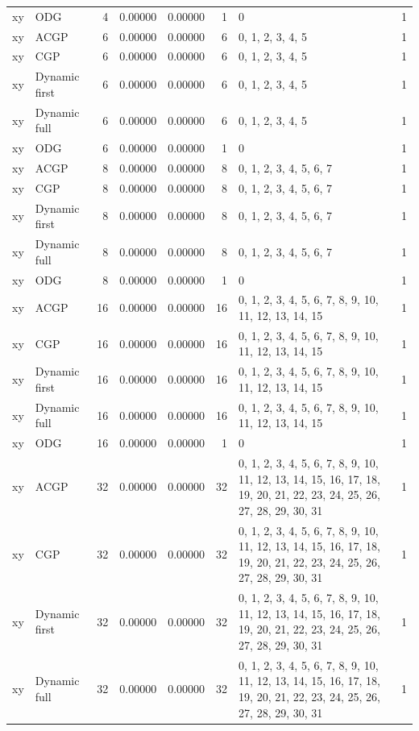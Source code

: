 \documentclass[10pt,a4paper]{article}
\begin{document}
\begin{longtable}{@{}p{23mm}p{29mm}rrrrp{36mm}r@{}}
xy & ODG & 4 & 0.00000 & 0.00000 & 1 & 0 & 1 \\
xy & ACGP & 6 & 0.00000 & 0.00000 & 6 & 0, 1, 2, 3, 4, 5 & 1 \\
xy & CGP & 6 & 0.00000 & 0.00000 & 6 & 0, 1, 2, 3, 4, 5 & 1 \\
xy & Dynamic first & 6 & 0.00000 & 0.00000 & 6 & 0, 1, 2, 3, 4, 5 & 1 \\
xy & Dynamic full & 6 & 0.00000 & 0.00000 & 6 & 0, 1, 2, 3, 4, 5 & 1 \\
xy & ODG & 6 & 0.00000 & 0.00000 & 1 & 0 & 1 \\
xy & ACGP & 8 & 0.00000 & 0.00000 & 8 & 0, 1, 2, 3, 4, 5, 6, 7 & 1 \\
xy & CGP & 8 & 0.00000 & 0.00000 & 8 & 0, 1, 2, 3, 4, 5, 6, 7 & 1 \\
xy & Dynamic first & 8 & 0.00000 & 0.00000 & 8 & 0, 1, 2, 3, 4, 5, 6, 7 & 1 \\
xy & Dynamic full & 8 & 0.00000 & 0.00000 & 8 & 0, 1, 2, 3, 4, 5, 6, 7 & 1 \\
xy & ODG & 8 & 0.00000 & 0.00000 & 1 & 0 & 1 \\
xy & ACGP & 16 & 0.00000 & 0.00000 & 16 & 0, 1, 2, 3, 4, 5, 6, 7, 8, 9, 10, 11, 12, 13, 14, 15 & 1 \\
xy & CGP & 16 & 0.00000 & 0.00000 & 16 & 0, 1, 2, 3, 4, 5, 6, 7, 8, 9, 10, 11, 12, 13, 14, 15 & 1 \\
xy & Dynamic first & 16 & 0.00000 & 0.00000 & 16 & 0, 1, 2, 3, 4, 5, 6, 7, 8, 9, 10, 11, 12, 13, 14, 15 & 1 \\
xy & Dynamic full & 16 & 0.00000 & 0.00000 & 16 & 0, 1, 2, 3, 4, 5, 6, 7, 8, 9, 10, 11, 12, 13, 14, 15 & 1 \\
xy & ODG & 16 & 0.00000 & 0.00000 & 1 & 0 & 1 \\
xy & ACGP & 32 & 0.00000 & 0.00000 & 32 & 0, 1, 2, 3, 4, 5, 6, 7, 8, 9, 10, 11, 12, 13, 14, 15, 16, 17, 18, 19, 20, 21, 22, 23, 24, 25, 26, 27, 28, 29, 30, 31 & 1 \\
xy & CGP & 32 & 0.00000 & 0.00000 & 32 & 0, 1, 2, 3, 4, 5, 6, 7, 8, 9, 10, 11, 12, 13, 14, 15, 16, 17, 18, 19, 20, 21, 22, 23, 24, 25, 26, 27, 28, 29, 30, 31 & 1 \\
xy & Dynamic first & 32 & 0.00000 & 0.00000 & 32 & 0, 1, 2, 3, 4, 5, 6, 7, 8, 9, 10, 11, 12, 13, 14, 15, 16, 17, 18, 19, 20, 21, 22, 23, 24, 25, 26, 27, 28, 29, 30, 31 & 1 \\
xy & Dynamic full & 32 & 0.00000 & 0.00000 & 32 & 0, 1, 2, 3, 4, 5, 6, 7, 8, 9, 10, 11, 12, 13, 14, 15, 16, 17, 18, 19, 20, 21, 22, 23, 24, 25, 26, 27, 28, 29, 30, 31 & 1 \\

\end{longtable}
\end{document}
